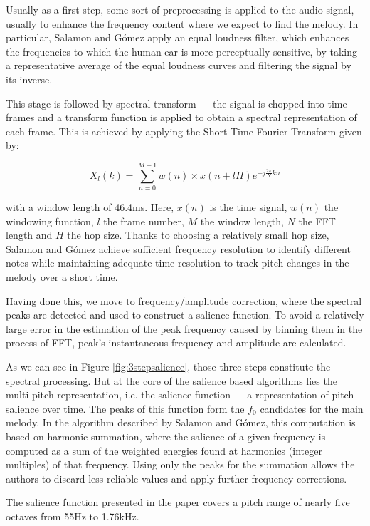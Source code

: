 Usually as a first step, some sort of preprocessing is applied to the audio signal, usually to enhance the frequency content where we expect to find the melody. In particular, Salamon and G\'{o}mez apply an equal loudness filter, which enhances the frequencies to which the human ear is more perceptually sensitive, by taking a representative average of the equal loudness curves and filtering the signal by its inverse. 

This stage is followed by spectral transform — the signal is chopped into time frames and a transform function is applied to obtain a spectral representation of each frame.
This is achieved by applying the Short-Time Fourier Transform given by:

\begin{equation}
X_{l}(k) = \sum_{n=0}^{M-1} w(n) \times x(n + lH) e^{-j\frac{2 \pi}{N}kn}
\end{equation}

with a window length of 46.4ms. Here, $x(n)$ is the time signal, $w(n)$ the windowing function, $l$ the frame number, $M$ the window length, $N$ the FFT length and $H$ the hop size. Thanks to choosing a relatively small hop size, Salamon and G\'{o}mez achieve sufficient frequency resolution to identify different notes while maintaining adequate time resolution to track pitch changes in the melody over a short time. 

Having done this, we move to frequency/amplitude correction, where the spectral peaks are detected and used to construct a salience function. To avoid a relatively large error in the estimation of the peak frequency caused by binning them in the process of FFT, peak’s instantaneous frequency and amplitude are calculated. 

As we can see in Figure \ref{fig:3stepsalience}, those three steps constitute the spectral processing. But at the core of the salience based algorithms lies the multi-pitch representation, i.e. the salience function — a representation of pitch salience over time. The peaks of this function form the $f_{0}$ candidates for the main melody. In the algorithm described by Salamon and G\'{o}mez, this computation is based on harmonic summation, where the salience of  a given frequency is computed as a sum of the weighted energies found at harmonics (integer multiples) of that frequency. Using only the peaks for the summation allows the authors to discard less reliable values and apply further frequency corrections. 

The salience function presented in the paper covers a pitch range of nearly five octaves from 55Hz to 1.76kHz.


